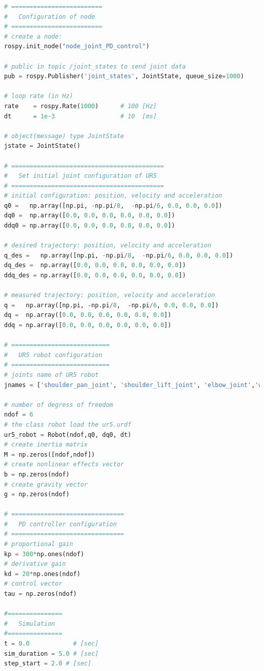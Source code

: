 \begin{lstlisting}[language=Python,caption={Move the second and fifth joint of UR5 robot with the required movement of activity 1.3.}, label={lst:joint_PD_control}]
# =========================
#   Configuration of node
# =========================
# create a node: 
rospy.init_node("node_joint_PD_control")

# public in topic /joint_states	to send joint data	
pub = rospy.Publisher('joint_states', JointState, queue_size=1000)

# loop rate (in Hz)
rate 	= rospy.Rate(1000)		# 100 [Hz]
dt 		= 1e-3					# 10  [ms]

# object(message) type JointState
jstate = JointState()

# ==========================================
#   Set initial joint configuration of UR5
# ==========================================
# initial configuration: position, velocity and acceleration 
q0 =   np.array([np.pi, -np.pi/8,  -np.pi/6, 0.0, 0.0, 0.0])
dq0 =  np.array([0.0, 0.0, 0.0, 0.0, 0.0, 0.0]) 
ddq0 = np.array([0.0, 0.0, 0.0, 0.0, 0.0, 0.0]) 

# desired trajectory: position, velocity and acceleration
q_des =   np.array([np.pi, -np.pi/8,  -np.pi/6, 0.0, 0.0, 0.0]) 
dq_des =  np.array([0.0, 0.0, 0.0, 0.0, 0.0, 0.0]) 
ddq_des = np.array([0.0, 0.0, 0.0, 0.0, 0.0, 0.0]) 

# measured trajectory: position, velocity and acceleration
q =   np.array([np.pi, -np.pi/8,  -np.pi/6, 0.0, 0.0, 0.0])
dq =  np.array([0.0, 0.0, 0.0, 0.0, 0.0, 0.0]) 
ddq = np.array([0.0, 0.0, 0.0, 0.0, 0.0, 0.0]) 

# ===========================
#   UR5 robot configuration
# ===========================
# joints name of UR5 robot
jnames = ['shoulder_pan_joint', 'shoulder_lift_joint', 'elbow_joint','wrist_1_joint', 'wrist_2_joint', 'wrist_3_joint']

# number of degress of freedom
ndof = 6
# the class robot load the ur5.urdf
ur5_robot = Robot(ndof,q0, dq0, dt)
# create inertia matrix 
M = np.zeros([ndof,ndof])
# create nonlinear effects vector
b = np.zeros(ndof)
# create gravity vector
g = np.zeros(ndof)

# ===============================
#   PD controller configuration
# ===============================
# proportional gain
kp = 300*np.ones(ndof)
# derivative gain
kd = 20*np.ones(ndof)
# control vector
tau = np.zeros(ndof)    

#===============
#   Simulation
#===============
t = 0.0            # [sec] 
sim_duration = 5.0 # [sec]
step_start = 2.0 # [sec]


\end{lstlisting}
